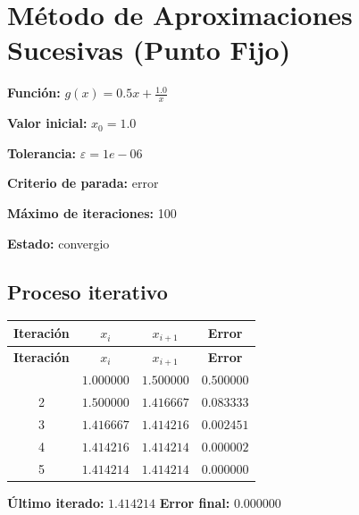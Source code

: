 \documentclass{article}
\begin{document}
\section*{Método de Aproximaciones Sucesivas (Punto Fijo)}

\textbf{Función:} $g(x) = 0.5 x + \frac{1.0}{x}$

\textbf{Valor inicial:} $x_0 = 1.0$

\textbf{Tolerancia:} $\varepsilon = 1e-06$

\textbf{Criterio de parada:} error

\textbf{Máximo de iteraciones:} 100

\textbf{Estado:} convergio

\subsection*{Proceso iterativo}

\begin{longtable}{|c|c|c|c|}
\hline
\textbf{Iteración} & \textbf{$x_{i}$} & \textbf{$x_{i+1}$} & \textbf{Error} \\ \hline
\endfirsthead
\hline
\textbf{Iteración} & \textbf{$x_{i}$} & \textbf{$x_{i+1}$} & \textbf{Error} \\ \hline
\endhead
\hline
\endfoot
\hline
\endlastfoot
1 & $1.000000$ & $1.500000$ & $0.500000$ \\ \hline
2 & $1.500000$ & $1.416667$ & $0.083333$ \\ \hline
3 & $1.416667$ & $1.414216$ & $0.002451$ \\ \hline
4 & $1.414216$ & $1.414214$ & $0.000002$ \\ \hline
5 & $1.414214$ & $1.414214$ & $0.000000$ \\ \hline
\end{longtable}

\textbf{Último iterado:} $1.414214$
\textbf{Error final:} $0.000000$
\end{document}
